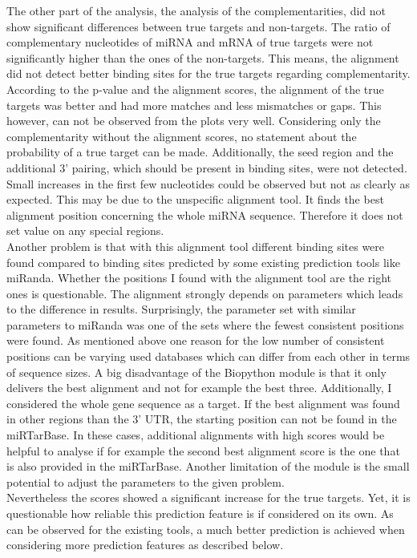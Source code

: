 \documentclass[11pt, a4paper, oneside]{book}
\begin{document}
The other part of the analysis, the analysis of the complementarities, did not show significant differences between true targets and non-targets. The ratio of complementary nucleotides of miRNA and mRNA of true targets were not significantly higher than the ones of the non-targets. This means, the alignment did not detect better binding sites for the true targets regarding complementarity. According to the p-value and the alignment scores, the alignment of the true targets was better and had more matches and less mismatches or gaps. This however, can not be observed from the plots very well. Considering only the complementarity without the alignment scores, no statement about the probability of a true target can be made. Additionally, the seed region and the additional 3' pairing, which should be present in binding sites, were not detected. Small increases in the first few nucleotides could be observed but not as clearly as expected. This may be due to the unspecific alignment tool. It finds the best alignment position concerning the whole miRNA sequence. Therefore it does not set value on any special regions.  \\

Another problem is that with this alignment tool different binding sites were found compared to binding sites predicted by some existing prediction tools like miRanda. Whether the positions I found with the alignment tool are the right ones is questionable. The alignment strongly depends on parameters which leads to the difference in results. Surprisingly, the parameter set with similar parameters to miRanda was one of the sets where the fewest consistent positions were found. As mentioned above one reason for the low number of consistent positions can be varying used databases which can differ from each other in terms of sequence sizes. A big disadvantage of the Biopython module is that it only delivers the best alignment and not for example the best three. Additionally, I considered the whole gene sequence as a target. If the best alignment was found in other regions than the 3' UTR, the starting position can not be found in the miRTarBase. In these cases, additional alignments with high scores would be helpful to analyse if for example the second best alignment score is the one that is also provided in the miRTarBase. Another limitation of the module is the small potential to adjust the parameters to the given problem. \\

Nevertheless the scores showed a significant increase for the true targets. Yet, it is questionable how reliable this prediction feature is if considered on its own. As can be observed for the existing tools, a much better prediction is achieved when considering more prediction features as described below.\\
\end{document}
